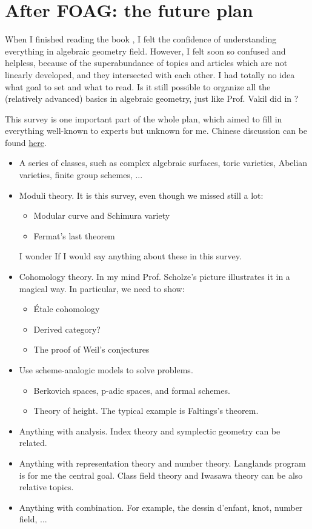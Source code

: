\section{After FOAG: the future plan}
When I finished reading the book \cite{FOAG}, I felt the confidence of understanding everything in algebraic geometry field. However, I felt soon so confused and helpless, because of the superabundance of topics and articles which are not linearly developed, and they intersected with each other. I had totally no idea what goal to set and what to read. Is it still possible to organize all the (relatively advanced) basics in algebraic geometry, just like Prof. Vakil did in \cite{FOAG}?

This survey is one important part of the whole plan, which aimed to fill in everything well-known to experts but unknown for me. Chinese discussion can be found \href{https://www.zhihu.com/question/318263266}{here}.

\begin{itemize}
\item A series of classes, such as complex algebraic surfaces, toric varieties, Abelian varieties, finite group schemes, ...
\item Moduli theory. It is this survey, even though we missed still a lot:
\begin{itemize}
\item Modular curve and Schimura variety
\item Fermat's last theorem
\end{itemize}
I wonder If I would say anything about these in this survey.
\item Cohomology theory. In my mind Prof. Scholze's picture illustrates it in a magical way. In particular, we need to show:
\begin{itemize}
\item Étale cohomology
\item Derived category?
\item The proof of Weil's conjectures
\end{itemize}
\item Use scheme-analogic models to solve problems.
\begin{itemize}
\item Berkovich spaces, p-adic spaces, and formal schemes.
\item Theory of height. The typical example is Faltings's theorem. 
\end{itemize}
\item Anything with analysis. Index theory and symplectic geometry can be related.
\item Anything with representation theory and number theory. Langlands program is for me the central goal. Class field theory and Iwasawa theory can be also relative topics.
\item Anything with combination. For example, the dessin d'enfant, knot, number field, ...
\end{itemize}